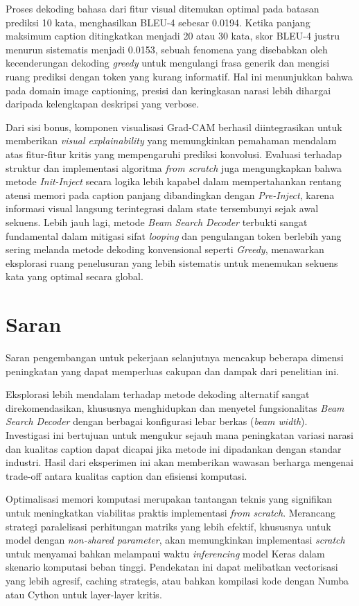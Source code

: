Proses dekoding bahasa dari fitur visual ditemukan optimal pada batasan prediksi 10 kata, menghasilkan BLEU-4 sebesar 0.0194. Ketika panjang maksimum caption ditingkatkan menjadi 20 atau 30 kata, skor BLEU-4 justru menurun sistematis menjadi 0.0153, sebuah fenomena yang disebabkan oleh kecenderungan dekoding \textit{greedy} untuk mengulangi frasa generik dan mengisi ruang prediksi dengan token yang kurang informatif. Hal ini menunjukkan bahwa pada domain image captioning, presisi dan keringkasan narasi lebih dihargai daripada kelengkapan deskripsi yang verbose.

Dari sisi bonus, komponen visualisasi Grad-CAM berhasil diintegrasikan untuk memberikan \textit{visual explainability} yang memungkinkan pemahaman mendalam atas fitur-fitur kritis yang mempengaruhi prediksi konvolusi. Evaluasi terhadap struktur dan implementasi algoritma \textit{from scratch} juga mengungkapkan bahwa metode \textit{Init-Inject} secara logika lebih kapabel dalam mempertahankan rentang atensi memori pada caption panjang dibandingkan dengan \textit{Pre-Inject}, karena informasi visual langsung terintegrasi dalam state tersembunyi sejak awal sekuens. Lebih jauh lagi, metode \textit{Beam Search Decoder} terbukti sangat fundamental dalam mitigasi sifat \textit{looping} dan pengulangan token berlebih yang sering melanda metode dekoding konvensional seperti \textit{Greedy}, menawarkan eksplorasi ruang penelusuran yang lebih sistematis untuk menemukan sekuens kata yang optimal secara global.

\section{Saran}

Saran pengembangan untuk pekerjaan selanjutnya mencakup beberapa dimensi peningkatan yang dapat memperluas cakupan dan dampak dari penelitian ini.

Eksplorasi lebih mendalam terhadap metode dekoding alternatif sangat direkomendasikan, khususnya menghidupkan dan menyetel fungsionalitas \textit{Beam Search Decoder} dengan berbagai konfigurasi lebar berkas (\textit{beam width}). Investigasi ini bertujuan untuk mengukur sejauh mana peningkatan variasi narasi dan kualitas caption dapat dicapai jika metode ini dipadankan dengan standar industri. Hasil dari eksperimen ini akan memberikan wawasan berharga mengenai trade-off antara kualitas caption dan efisiensi komputasi.

Optimalisasi memori komputasi merupakan tantangan teknis yang signifikan untuk meningkatkan viabilitas praktis implementasi \textit{from scratch}. Merancang strategi paralelisasi perhitungan matriks yang lebih efektif, khususnya untuk model dengan \textit{non-shared parameter}, akan memungkinkan implementasi \textit{scratch} untuk menyamai bahkan melampaui waktu \textit{inferencing} model Keras dalam skenario komputasi beban tinggi. Pendekatan ini dapat melibatkan vectorisasi yang lebih agresif, caching strategis, atau bahkan kompilasi kode dengan Numba atau Cython untuk layer-layer kritis.

